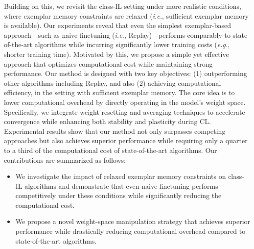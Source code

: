 Building on this, we revisit the class-IL setting under more realistic conditions, where exemplar memory constraints are relaxed (\textit{i.e.}, sufficient exemplar memory is available). Our experiments reveal that even the simplest exemplar-based approach—such as naive finetuning (\textit{i.e.}, Replay)—performs comparably to state-of-the-art algorithms while incurring significantly lower training costs (\textit{e.g.}, shorter training time). 
Motivated by this, we propose a simple yet effective approach that optimizes computational cost while maintaining strong performance. Our method is designed with two key objectives: (1) outperforming other algorithms including Replay, and also (2) achieving computational efficiency,  in the setting with sufficient exemplar memory. The core idea is to lower computational overhead by directly operating in the model’s weight space. Specifically, we integrate weight resetting and averaging techniques to accelerate convergence while enhancing both stability and plasticity during CL. Experimental results show that our method not only surpasses competing approaches but also achieves superior performance while requiring only a quarter to a third of the computational cost of state-of-the-art algorithms. Our contributions are summarized as follows:
\begin{itemize}
    \item We investigate the impact of relaxed exemplar memory constraints on class-IL algorithms and demonstrate that even naive finetuning performs competitively under these conditions while significantly reducing the computational cost.
    \item We propose a novel weight-space manipulation strategy that achieves superior performance while drastically reducing computational overhead compared to state-of-the-art algorithms.
\end{itemize}





